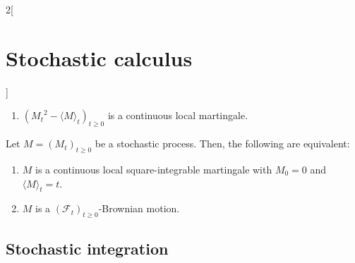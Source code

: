 \documentclass[../../../main_math.tex]{subfiles}
\begin{document}
\begin{multicols}{2}[\section{Stochastic calculus}]
\begin{proposition}
\begin{enumerate}
      \item ${({M_t}^2-{\langle M\rangle}_t)}_{t\geq 0}$ is a continuous local martingale.
    \end{enumerate}
  \end{proposition}
  \begin{theorem}
    Let $M={(M_t)}_{t\geq 0}$ be a stochastic process. Then, the following are equivalent:
    \begin{enumerate}
      \item $M$ is a continuous local square-integrable martingale with $M_0=0$ and ${\langle M\rangle}_t=t$.
      \item $M$ is a ${(\mathcal{F}_t)}_{t\geq 0}$-Brownian motion.
    \end{enumerate}
  \end{theorem}
  \subsection{Stochastic integration}

\end{multicols}
\end{document}
